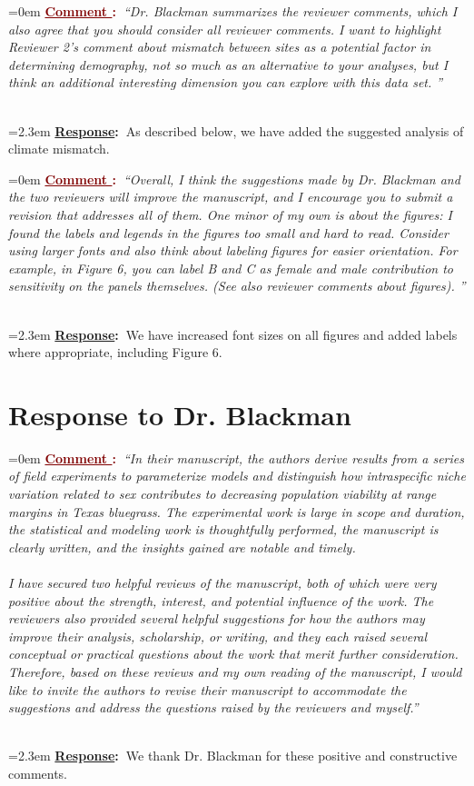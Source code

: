 \documentclass[12pt]{article}
\newcounter{cN}
\newcommand{\comment}[1]{
	\vspace{2em}
	\refstepcounter{cN} %
	\noindent \hangindent=0em \textbf{\textcolor{Maroon}{\uline{Comment \thecN}:~}}\emph{``#1''}
	}
\newcommand{\response}[1]{
	\\[0.25em]
	\hangindent=2.3em \textbf{\textcolor{NavyBlue}{\uline{Response}:~}}#1
	}
\begin{document}
\comment{Dr. Blackman summarizes the reviewer comments, which I also agree that you should consider all reviewer comments. I want to highlight Reviewer 2's comment about mismatch between sites as a potential factor in determining demography, not so much as an alternative to your analyses, but I think an additional interesting dimension you can explore with this data set. }
\response{As described below, we have added the suggested analysis of climate mismatch.}

\comment{Overall, I think the suggestions made by Dr. Blackman and the two reviewers will improve the manuscript, and I encourage you to submit a revision that addresses all of them. One minor of my own is about the figures: I found the labels and legends in the figures too small and hard to read. Consider using larger fonts and also think about labeling figures for easier orientation. For example, in Figure 6, you can label B and C as female and male contribution to sensitivity on the panels themselves. (See also reviewer comments about figures). }
\response{We have increased font sizes on all figures and added labels where appropriate, including Figure 6.}

\section{Response to Dr. Blackman}
\vspace{-2em}

\comment{In their manuscript, the authors derive results from a series of field experiments to parameterize models and distinguish how intraspecific niche variation related to sex contributes to decreasing population viability at range margins in Texas bluegrass. The experimental work is large in scope and duration, the statistical and modeling work is thoughtfully performed, the manuscript is clearly written, and the insights gained are notable and timely.
\\	
\\
I have secured two helpful reviews of the manuscript, both of which were very positive about the strength, interest, and potential influence of the work. The reviewers also provided several helpful suggestions for how the authors may improve their analysis, scholarship, or writing, and they each raised several conceptual or practical questions about the work that merit further consideration. Therefore, based on these reviews and my own reading of the manuscript, I would like to invite the authors to revise their manuscript to accommodate the suggestions and address the questions raised by the reviewers and myself.}
\response{We thank Dr. Blackman for these positive and constructive comments.}
\end{document}

